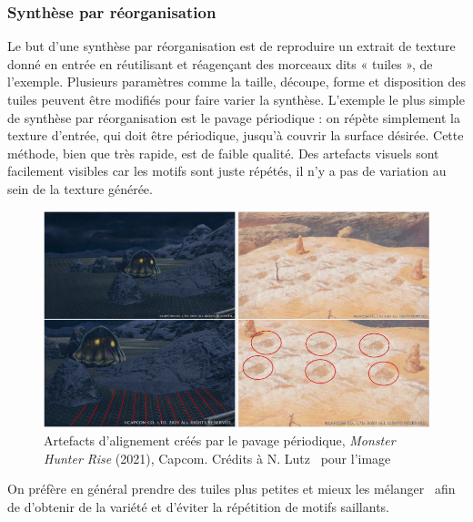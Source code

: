 \subsubsection{Synthèse par réorganisation}

Le but d'une synthèse par réorganisation est de reproduire un extrait de texture donné en entrée en réutilisant et réagençant des morceaux dits « tuiles », de l'exemple. Plusieurs paramètres comme la taille, découpe, forme et disposition des tuiles peuvent être modifiés pour faire varier la synthèse. L'exemple le plus simple de synthèse par réorganisation est le pavage périodique : on répète simplement la texture d'entrée, qui doit être périodique, jusqu'à couvrir la surface désirée. Cette méthode, bien que très rapide, est de faible qualité. Des artefacts visuels sont facilement visibles car les motifs sont juste répétés, il n'y a pas de variation au sein de la texture générée.


\bigskip

\begin{figure}
    \centering
    \includegraphics[width=\textwidth]{contenu/resources/images/periodic_tiling}
    \caption[Artefacts d'alignement créés par le pavage périodique]{Artefacts d'alignement créés par le pavage périodique, \textit{Monster Hunter Rise} (2021), Capcom. Crédits à N. Lutz~\cite{lutz_processus_2021} pour l'image}
    \label{fig:pavage_periodique}
\end{figure}

On préfère en général prendre des tuiles plus petites et mieux les mélanger~\cite{heitz_high-performance_2018} afin de d'obtenir de la variété et d'éviter la répétition de motifs saillants. 


